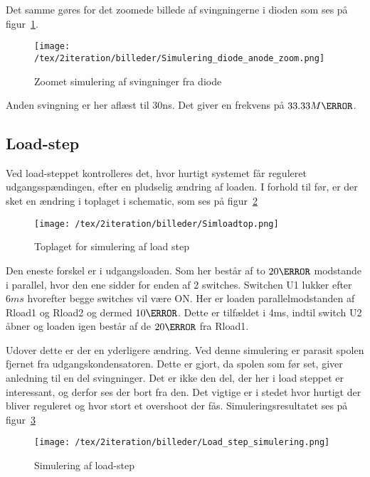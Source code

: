 \noindent Det samme gøres for det zoomede billede af svingningerne i dioden som ses på figur~\ref{fig: simdiodezoom}. 
\begin{figure}[H]
	\center
	\texttt{[image: /tex/2iteration/billeder/Simulering\_diode\_anode\_zoom.png]}
	\caption{Zoomet simulering af svingninger fra diode}
	\label{fig: simdiodezoom}
\end{figure}
\noindent Anden svingning er her aflæst til 30ns. Det giver en frekvens på $33.33M\hertz$.



  

\subsection{Load-step} \label{loadstep2ite}
Ved load-steppet kontrolleres det, hvor hurtigt systemet får reguleret udgangsspændingen, efter en pludselig ændring af loaden. I forhold til før, er der sket en ændring i toplaget i schematic, som ses på figur~\ref{fig: simloadtop}  
\begin{figure}[H]
	\center
	\texttt{[image: /tex/2iteration/billeder/Simloadtop.png]}
	\caption{Toplaget for simulering af load step}
	\label{fig: simloadtop}
\end{figure}
Den eneste forskel er i udgangsloaden. Som her består af to $20\ohm$ modstande i parallel, hvor den ene sidder for enden af 2 switches. Switchen U1 lukker efter $6ms$ hvorefter begge switches vil være ON. Her er loaden parallelmodstanden af Rload1 og Rload2 og dermed $10\ohm$. Dette er tilfældet i 4ms, indtil switch U2 åbner og loaden igen består af de $20\ohm$ fra Rload1.

Udover dette er der en yderligere ændring. Ved denne simulering er parasit spolen fjernet fra udgangskondensatoren. Dette er gjort, da spolen som før set, giver anledning til en del svingninger. Det er ikke den del, der her i load steppet er interessant, og derfor ses der bort fra den. Det vigtige er i stedet hvor hurtigt der bliver reguleret og hvor stort et overshoot der fås. Simuleringsresultatet ses på figur~\ref{fig: simloadstep} 

\begin{figure}[H]
	\center
	\texttt{[image: /tex/2iteration/billeder/Load\_step\_simulering.png]}
	\caption{Simulering af load-step}
	\label{fig: simloadstep}
\end{figure}

